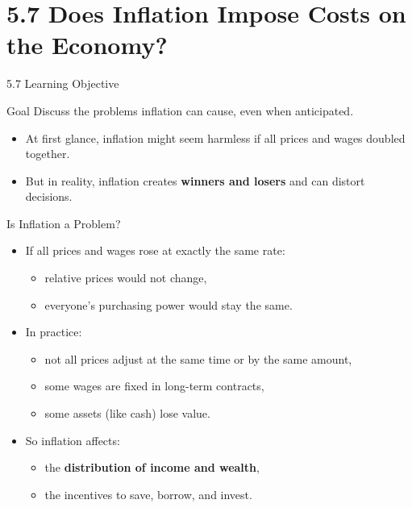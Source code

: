 \documentclass[aspectratio=169]{beamer}
\begin{document}
\section{5.7 Does Inflation Impose Costs on the Economy?}

\begin{frame}{5.7 Learning Objective}
\transfade
\begin{block}{Goal}
Discuss the problems inflation can cause, even when anticipated.
\end{block}
\begin{itemize}
  \item At first glance, inflation might seem harmless if all prices and wages doubled together.
  \item But in reality, inflation creates \textbf{winners and losers} and can distort decisions.
\end{itemize}
\end{frame}

\begin{frame}{Is Inflation a Problem?}
\transfade
\begin{itemize}
  \item If all prices and wages rose at exactly the same rate:
  \begin{itemize}
    \item relative prices would not change,
    \item everyone’s purchasing power would stay the same.
  \end{itemize}
  \item In practice:
  \begin{itemize}
    \item not all prices adjust at the same time or by the same amount,
    \item some wages are fixed in long-term contracts,
    \item some assets (like cash) lose value.
  \end{itemize}
  \item So inflation affects:
  \begin{itemize}
    \item the \textbf{distribution of income and wealth},
    \item the incentives to save, borrow, and invest.
  \end{itemize}
\end{itemize}
\end{frame}
\end{document}
